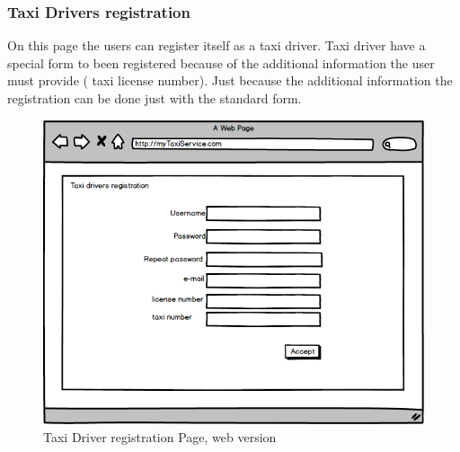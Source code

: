 \documentclass{report}
\begin{document}
			\subsubsection{Taxi Drivers registration}
			On this page the users can register itself as a taxi driver. Taxi driver have a special form to been registered because of the additional information the user must provide ( taxi license 				number). Just because the additional information the registration can be done just with the standard form.
			\begin{figure}[H]
			\centering
			\includegraphics[scale=0.5]{IMG/UserInterfaces/TaxiDriverRegistration.png}
			\caption{Taxi Driver registration Page, web version}\label{visina8}
			\end{figure}
\end{document}
